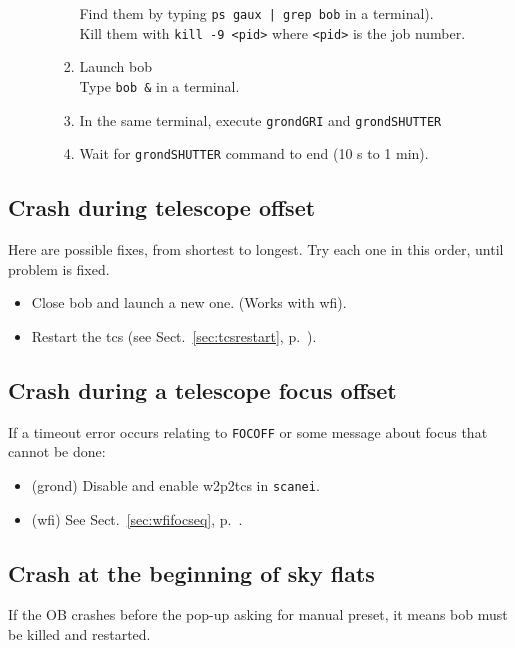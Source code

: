 \documentclass[11pt,fleqn]{book}
\def\secref#1{Sect.~\ref{sec:#1}, p.~\pageref{sec:#1}}
\begin{document}
\begin{enumerate}
\begin{enumerate}
\begin{enumerate}
                   Find them by typing \texttt{ps gaux | grep bob} in a terminal).\\
                   Kill them with \texttt{kill -9 <pid>} where \texttt{<pid>} is the job number.
             \item Launch \gls{bob}\\  
                   Type \texttt{bob \&} in a terminal.
             \item In the same terminal, execute \texttt{grondGRI} and \texttt{grondSHUTTER}
             \item Wait for \texttt{grondSHUTTER} command to end (10 s to 1 min).
             \end{enumerate}
  \end{enumerate}
\end{enumerate}

\subsection{Crash during telescope offset}

Here are possible fixes, from shortest to longest.  Try each one in this
order, until problem is fixed.
\begin{itemize}
  \item Close \gls{bob} and launch a new one. (Works with \gls{wfi}).
  \item Restart the \gls{tcs} (see \secref{tcsrestart}).
\end{itemize}

\subsection{Crash during a telescope focus offset}
If a timeout error occurs relating to \texttt{FOCOFF} or some message about
focus that cannot be done:
\begin{itemize}
  \item (\gls{grond}) Disable and enable \gls{w2p2tcs} in \texttt{scanei}.
  \item (\gls{wfi}) See \secref{wfifocseq}.
\end{itemize}

\subsection{Crash at the beginning of sky flats}
If the OB crashes before the pop-up asking for manual preset, it means
bob must be killed and restarted.
\end{document}
